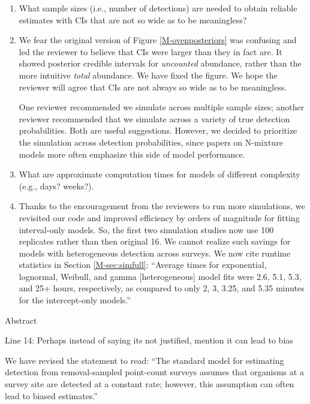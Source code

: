 \documentclass[12pt]{article}
\renewenvironment{quote}  %
              {\list{}{\rightmargin\leftmargin}\normalfont%
               \item\relax}
              {\endlist}
\begin{document}
\begin{enumerate}
\item What sample sizes (i.e., number of detections) are needed to obtain reliable estimates with CIs that are not so wide as to be meaningless?

\begin{quote}
We fear the original version of Figure \ref{M-ovenposteriors} was confusing and led the reviewer to believe that CIs were larger than they in fact are.
It showed posterior credible intervals for \textit{uncounted} abundance, rather than the more intuitive \textit{total} abundance.
We have fixed the figure.
We hope the reviewer will agree that CIs are not always so wide as to be meaningless.

One reviewer recommended we simulate across multiple sample sizes; another reviewer recommended that we simulate across a variety of true detection probabilities.
Both are useful suggestions.
However, we decided to prioritize the simulation across detection probabilities, since papers on N-mixture models more often emphasize this side of model performance.
\end{quote}

\item What are approximate computation times for models of different complexity (e.g., days? weeks?).
\begin{quote}
Thanks to the encouragement from the reviewers to run more simulations, we revisited our code and improved efficiency by orders of magnitude for fitting interval-only models.
So, the first two simulation studies now use 100 replicates rather than then original 16.
We cannot realize such savings for models with heterogeneous detection across surveys.
We now cite runtime statistics in Section \ref{M-sec:simfull}: ``Average times for exponential, lognormal, Weibull, and gamma [heterogeneous] model fits were 2.6, 5.1, 5.3, and 25+ hours, respectively, as compared to only 2, 3, 3.25, and 5.35 minutes for the intercept-only models.''
\end{quote}

\end{enumerate}


Abstract

Line 14: Perhaps instead of saying its not justified, mention it can lead to bias
\begin{quote}
We have revised the statement to read: ``The standard model for estimating detection from removal-sampled point-count surveys assumes that organisms at a survey site are detected at a constant rate; however, this assumption can often lead to biased estimates.''
\end{quote}
\end{document}
